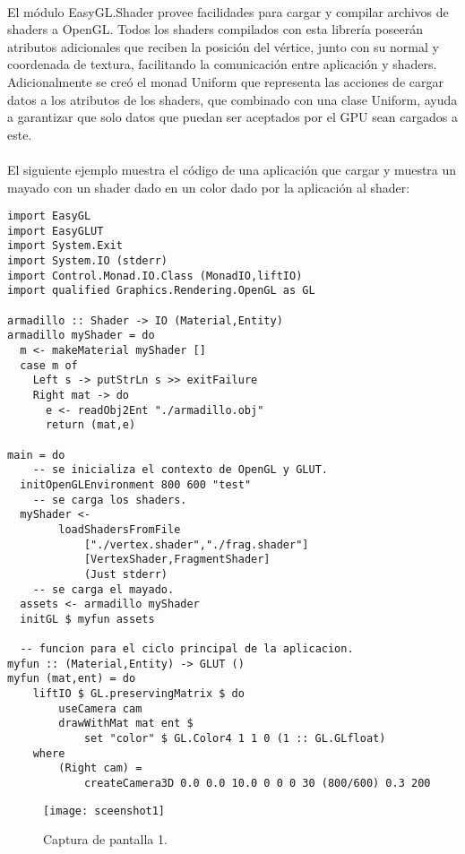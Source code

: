\documentclass{standalone}
\begin{document}
\paragraph{}
El módulo EasyGL.Shader provee facilidades para cargar y compilar archivos de shaders a OpenGL. Todos los shaders compilados con esta librería poseerán atributos adicionales que reciben la posición del vértice, junto con su normal y coordenada de textura, facilitando la comunicación entre aplicación y shaders. Adicionalmente se creó el monad Uniform que representa las acciones de cargar datos a los atributos de los shaders, que combinado con una clase Uniform, ayuda a garantizar que solo datos que puedan ser aceptados por el GPU sean cargados a este.

\paragraph{}
El siguiente ejemplo muestra el código de una aplicación que cargar y muestra un mayado con un shader dado en un color dado por la aplicación al shader:

\begin{lstlisting}
import EasyGL
import EasyGLUT
import System.Exit
import System.IO (stderr)
import Control.Monad.IO.Class (MonadIO,liftIO)
import qualified Graphics.Rendering.OpenGL as GL

armadillo :: Shader -> IO (Material,Entity)
armadillo myShader = do
  m <- makeMaterial myShader []
  case m of
    Left s -> putStrLn s >> exitFailure
    Right mat -> do
      e <- readObj2Ent "./armadillo.obj"
      return (mat,e)

main = do
	-- se inicializa el contexto de OpenGL y GLUT.
  initOpenGLEnvironment 800 600 "test"
	-- se carga los shaders.
  myShader <-
		loadShadersFromFile
			["./vertex.shader","./frag.shader"]
			[VertexShader,FragmentShader]
			(Just stderr)
	-- se carga el mayado.
  assets <- armadillo myShader
  initGL $ myfun assets

  -- funcion para el ciclo principal de la aplicacion.
myfun :: (Material,Entity) -> GLUT ()
myfun (mat,ent) = do
	liftIO $ GL.preservingMatrix $ do
		useCamera cam
		drawWithMat mat ent $
			set "color" $ GL.Color4 1 1 0 (1 :: GL.GLfloat)
	where
		(Right cam) =
			createCamera3D 0.0 0.0 10.0 0 0 0 30 (800/600) 0.3 200
\end{lstlisting}

\begin{figure}[h!]
  \caption{Captura de pantalla 1.}
  \begin{center}
    \texttt{[image: sceenshot1]}
  \end{center}
\end{figure}
\end{document}
